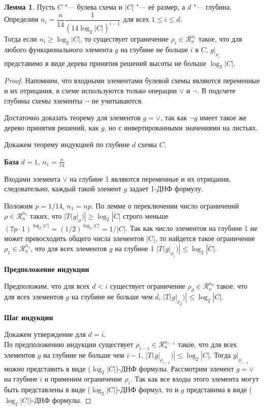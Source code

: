 \documentclass[12pt]{article}
\theoremstyle{plain}
\theoremstyle{remark}
\theoremstyle{definition}
\newtheorem{lemma}[theorem]{Лемма}
\begin{document}
\begin{lemma}
Пусть $C$ "--- булева схема и $|C|$ "--- её размер, а $d$ "--- глубина. Определим $n_i = \dfrac{n}{14} \dfrac{1}{(14 \log_2|C|)^{i - 1}}$ для всех $1 \le i \le d$.\\
Тогда если $n_i \ge \log_2|C|$, то существует ограничение $\rho_i \in \mathcal{R}_n^{n_i}$ такое, что для любого функционального элемента $g$ на глубине не больше $i$ в $C$, $g|_{\rho_i}$ представимо в виде дерева принятия решений высоты не больше $\log_2|C|$.
\end{lemma}
\begin{proof}
Напомним, что входными элементами булевой схемы являются переменные и их отрицания, в схеме используются только операции $\vee$ и $\lnot$. В подсчете глубины схемы элементы $\lnot$ не учитываются.

Достаточно доказать теорему для элементов $g = \vee$, так как $\lnot g$ имеет такое же дерево принятия решений, как $g$, но с инвертированными значениями на листьях.

Докажем теорему индукцией по глубине $d$ схемы $C$.

\textbf{База} $d = 1$, $n_1 = \frac{n}{14}$ 

Входами элемента $\vee$ на глубине 1 являются переменные и их отрицания, следовательно, каждый такой элемент $g$ задает 1-ДНФ формулу. 

Положим $p = 1/14$, $n_1 = np$. По лемме о переключении число ограничений $\rho \in \mathcal{R}_n^{n_1}$ таких, что  $|T(g|_\rho)| \ge \log_2|C|$ строго меньше $(7 p \cdot 1)^{\log_2|C|} = (1/2)^{\log_2|C|} = 1/|C|$. Так как число элементов на глубине 1 не может превосходить общего числа элементов |C|, то найдется такое ограничение $\rho_1 \in \mathcal{R}_n^{n_1}$, что для всех элементов $g$ на глубине 1 $|T(g|_{\rho_1})| \le \log_2|C|$.

\textbf{Предположение индукции}

Предположим, что для всех $d < i$ существует ограничение $\rho_d \in \mathcal{R}_n^{n_d}$ такое, что для всех элементов $g$ на глубине не больше чем $d$, $|T(g|_{\rho_d})| \le \log_2|C|$. 

\textbf{Шаг индукции}

Докажем утверждение для $d = i$. \\
По предположению индукции существует $\rho_{i - 1} \in \mathcal{R}_n^{n_{i - 1}}$ такое, что для всех элементов $g$ на глубине не больше чем $i - 1$, $|T(g|_{\rho_{i - 1}})| \le \log_2|C|$. Тогда $g|_{\rho_{i - 1}}$ можно представить в виде ($\log_2|C|$)-ДНФ формулы. Рассмотрим элемент $g = \vee$ на глубине $i$ и применим ограничение $\rho_i$. Так как все входы этого элемента могут быть представлены в виде ($\log_2|C|$)-ДНФ формул, то и $g$ представима в виде ($\log_2|C|$)-ДНФ формулы. 


\end{proof}
\end{document}
